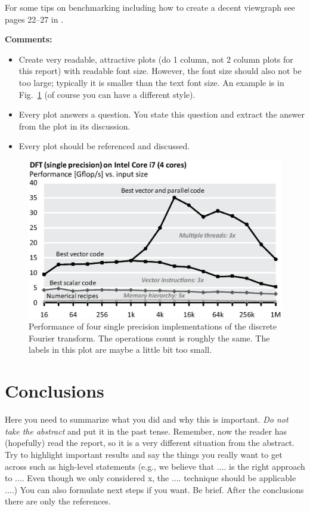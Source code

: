 \documentclass[letterpaper]{article}
\begin{document}
For some tips on benchmarking including how to create a decent viewgraph see pages 22--27 in \cite{Pueschel:10}.

{\bf Comments:}
\begin{itemize}
	\item Create very readable, attractive plots (do 1 column, not 2 column plots
	      for this report) with readable font size. However, the font size should also not be too large; typically it is smaller than the text font size.
	      An example is in Fig.~\ref{fftperf} (of course you can have a different style).
	\item Every plot answers a question. You state this question and extract the
	      answer from the plot in its discussion.
	\item Every plot should be referenced and discussed.
\end{itemize}

\begin{figure}\centering
	\includegraphics[scale=0.33]{dft-performance.eps}
	\caption{Performance of four single precision implementations of the
		discrete Fourier transform. The operations count is roughly the
		same. The labels in this plot are maybe a little bit too small.\label{fftperf}}
\end{figure}

\section{Conclusions}

Here you need to summarize what you did and why this is
important. {\em Do not take the abstract} and put it in the past
tense. Remember, now the reader has (hopefully) read the report, so it
is a very different situation from the abstract. Try to highlight
important results and say the things you really want to get across
such as high-level statements (e.g., we believe that .... is the right
approach to .... Even though we only considered x, the
.... technique should be applicable ....) You can also formulate next
steps if you want. Be brief. After the conclusions there are only the references.
\end{document}
